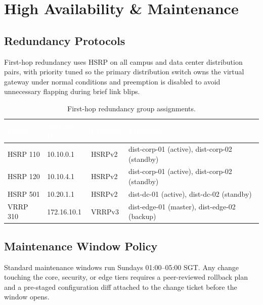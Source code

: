 \documentclass[11pt,a4paper]{report}
\newcommand{\thd}[1]{\textcolor{white}{\textbf{#1}}}
\begin{document}
\chapter{High Availability \& Maintenance}

\section{Redundancy Protocols}
First-hop redundancy uses HSRP on all campus and data center distribution pairs, with
priority tuned so the primary distribution switch owns the virtual gateway under normal
conditions and preemption is disabled to avoid unnecessary flapping during brief link blips.

\begin{table}[H]
\centering
{}
\begin{tabularx}{\linewidth}{@{}l l l X@{}}
\toprule
\rowcolor{navy}
\thd{Group} & \thd{Virtual IP} & \thd{Protocol} & \thd{Members} \\
\midrule
HSRP 110 & 10.10.0.1  & HSRPv2 & dist-corp-01 (active), dist-corp-02 (standby) \\
HSRP 120 & 10.10.4.1  & HSRPv2 & dist-corp-01 (active), dist-corp-02 (standby) \\
HSRP 501 & 10.20.1.1  & HSRPv2 & dist-dc-01 (active), dist-dc-02 (standby) \\
VRRP 310 & 172.16.10.1 & VRRPv3 & dist-edge-01 (master), dist-edge-02 (backup) \\
\bottomrule
\end{tabularx}
\caption{First-hop redundancy group assignments.}
\label{tab:hsrp}
\end{table}

\section{Maintenance Window Policy}
\begin{designnote}
Standard maintenance windows run Sundays 01:00--05:00 SGT. Any change touching the core,
security, or edge tiers requires a peer-reviewed rollback plan and a pre-staged
configuration diff attached to the change ticket before the window opens.
\end{designnote}
\end{document}
